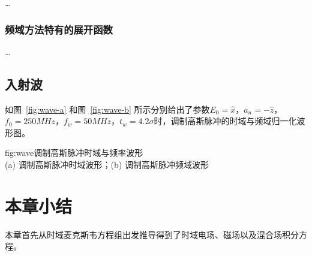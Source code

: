 \ldots

\subsubsection{频域方法特有的展开函数}

\ldots

\subsection{入射波}

如图~\ref{fig:wave-a} 和图~\ref{fig:wave-b} 所示分别给出了参数$E_0=\hat{x}$，$a_n=-\hat{z}$，$f_0=250MHz$，$f_w=50MHz$，$t_w=4.2\sigma$时，调制高斯脉冲的时域与频域归一化波形图。

\begin{Figure}{fig:wave}{调制高斯脉冲时域与频率波形\\
      (a) 调制高斯脉冲时域波形；(b) 调制高斯脉冲频域波形}
\end{Figure}

\section{本章小结}

本章首先从时域麦克斯韦方程组出发推导得到了时域电场、磁场以及混合场积分方程。
